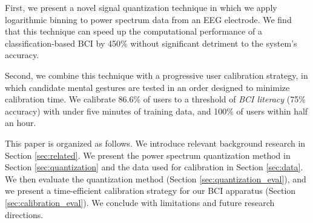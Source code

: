 

First, we present a novel signal quantization technique in which we apply logarithmic binning to power spectrum data from an EEG electrode. We find that this technique can speed up the computational performance of a classification-based BCI by 450\% without significant detriment to the system's accuracy. 

Second, we combine this technique with a progressive user calibration strategy, in which candidate mental gestures are tested in an order designed to minimize calibration time. We calibrate 86.6\% of users to a threshold of \textit{BCI literacy} (75\% accuracy) \cite{vidaurre_towards_2010} with under five minutes of training data, and 100\% of users within half an hour. 

This paper is organized as follows. We introduce relevant background research in Section \ref{sec:related}. We present the power spectrum quantization method in Section \ref{sec:quantization} and the data used for calibration in Section \ref{sec:data}. We then evaluate the quantization method (Section \ref{sec:quantization_eval}), and we present a time-efficient calibration strategy for our BCI apparatus (Section \ref{sec:calibration_eval}). We conclude with limitations and future research directions.
